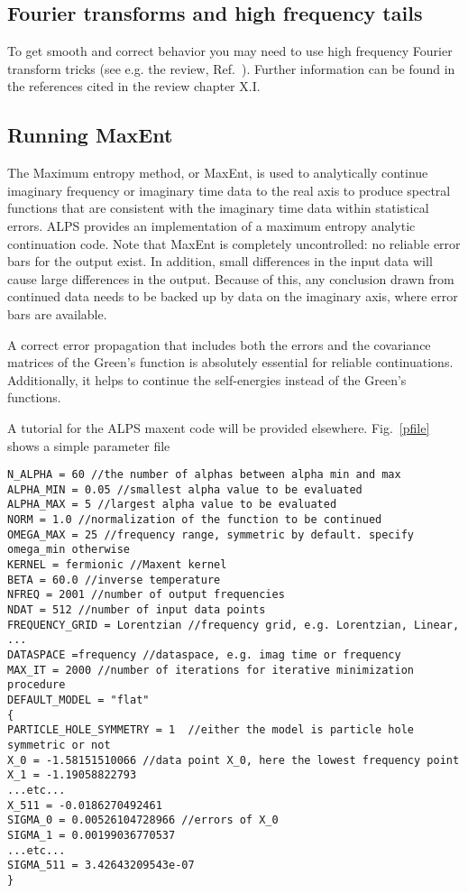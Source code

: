 \documentclass[aps,prb,floatfix,superscriptaddress,twocolumn,notitlepage]{revtex4-1}
\begin{document}
\subsection{Fourier transforms and high frequency tails}
To get smooth and correct behavior you may need to use high frequency Fourier transform tricks (see e.g. the review, Ref.~). Further information can be found in the references cited in the review chapter X.I.

\subsection{Running MaxEnt}
The Maximum entropy method, or MaxEnt, is used to analytically continue imaginary frequency or imaginary time data to the real axis to produce spectral functions that are consistent with the imaginary time data within  statistical errors.\cite{Jarrell96} ALPS provides an implementation of a maximum entropy analytic continuation code. Note that MaxEnt is completely uncontrolled: no reliable error bars for the output exist. In addition, small differences in the input data will cause large differences in the output. Because of this, any conclusion drawn from continued data needs to be backed up by data on the imaginary axis, where error bars are available.

A correct error propagation that includes both the errors and the covariance matrices of the Green's function is absolutely essential for reliable continuations. Additionally, it helps to continue the self-energies instead of the Green's functions\cite{Wang09gap}.

A tutorial for the ALPS maxent code will be provided elsewhere. Fig.~\ref{pfile} shows a simple parameter file

\begin{figure*}
\begin{verbatim}
N_ALPHA = 60 //the number of alphas between alpha min and max
ALPHA_MIN = 0.05 //smallest alpha value to be evaluated
ALPHA_MAX = 5 //largest alpha value to be evaluated
NORM = 1.0 //normalization of the function to be continued
OMEGA_MAX = 25 //frequency range, symmetric by default. specify omega_min otherwise
KERNEL = fermionic //Maxent kernel
BETA = 60.0 //inverse temperature
NFREQ = 2001 //number of output frequencies
NDAT = 512 //number of input data points
FREQUENCY_GRID = Lorentzian //frequency grid, e.g. Lorentzian, Linear, ...
DATASPACE =frequency //dataspace, e.g. imag time or frequency
MAX_IT = 2000 //number of iterations for iterative minimization procedure
DEFAULT_MODEL = "flat"
{
PARTICLE_HOLE_SYMMETRY = 1  //either the model is particle hole symmetric or not
X_0 = -1.58151510066 //data point X_0, here the lowest frequency point
X_1 = -1.19058822793
...etc...
X_511 = -0.0186270492461
SIGMA_0 = 0.00526104728966 //errors of X_0
SIGMA_1 = 0.00199036770537
...etc...
SIGMA_511 = 3.42643209543e-07
}
\end{verbatim}
\caption{A simple parameter file for the maxent code.\label{pfile}}
\end{figure*}
\end{document}

